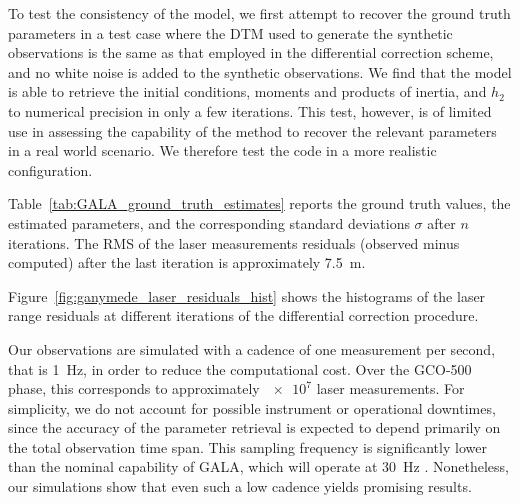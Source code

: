 \documentclass[lineno, pdflatex,sn-mathphys-ay]{sn-jnl}
\theoremstyle{thmstyleone}%
\theoremstyle{thmstyletwo}%
\theoremstyle{thmstylethree}%
\begin{document}
To test the consistency of the model, we first attempt to recover the ground truth parameters in a test case where the DTM used to generate the synthetic observations is the same as that employed in the differential correction scheme, and no white noise is added to the synthetic observations. We find that the model is able to retrieve the initial conditions, moments and products of inertia, and $h_2$ to numerical precision in only a few iterations. 
This test, however, is of limited use in assessing the capability of the method to recover the relevant parameters in a real world scenario. We therefore test the code in a more realistic configuration.

Table~\ref{tab:GALA_ground_truth_estimates} reports the ground truth values, the estimated parameters, and the corresponding standard deviations $\sigma$ after $n$ iterations. The RMS of the laser measurements residuals (observed minus computed) after the last iteration is approximately 
\SI{7.5}{m}. %
%

Figure~\ref{fig:ganymede_laser_residuals_hist} shows the histograms of the laser range residuals  at different iterations of the differential correction procedure. 
%


Our observations are simulated with a cadence of one measurement per second, that is \SI{1}{Hz}, in order to reduce the computational cost.
Over the GCO-500 phase, this corresponds to approximately $\num{e7}$ laser measurements. For simplicity, we do not account for possible instrument or operational downtimes, since the accuracy of the parameter retrieval is expected to depend primarily on the total observation time span.
This sampling frequency is significantly lower than the nominal capability of GALA, which will operate at \SI{30}{Hz} \citep{2019Geosc...9..320S}. Nonetheless, our simulations show that even such a low cadence yields promising results.
\end{document}
